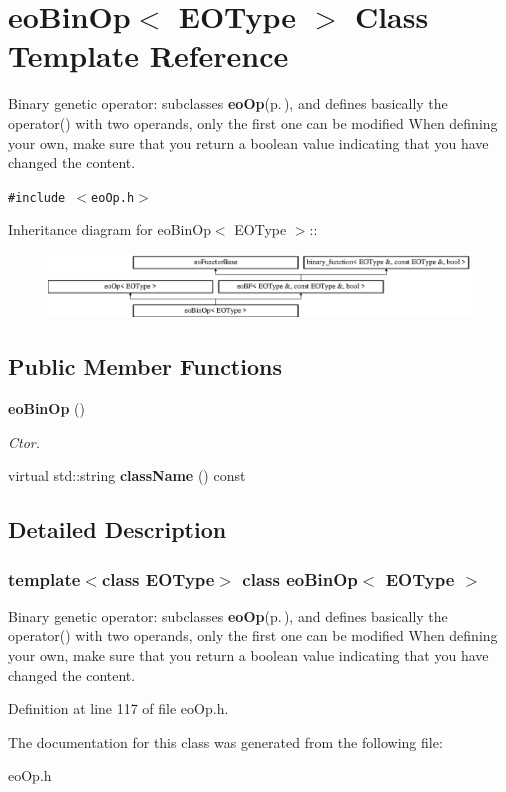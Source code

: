 \section{eo\-Bin\-Op$<$ EOType $>$ Class Template Reference}
\label{classeo_bin_op}
Binary genetic operator: subclasses {\bf eo\-Op}{\rm (p.\,\pageref{classeo_op})}, and defines basically the operator() with two operands, only the first one can be modified When defining your own, make sure that you return a boolean value indicating that you have changed the content.  


{\tt \#include $<$eo\-Op.h$>$}

Inheritance diagram for eo\-Bin\-Op$<$ EOType $>$::\begin{figure}[H]
\begin{center}
\leavevmode
\includegraphics[height=1.70213cm]{classeo_bin_op}
\end{center}
\end{figure}
\subsection*{Public Member Functions}
\begin{CompactItemize}
\item 
{\bf eo\-Bin\-Op} ()\label{classeo_bin_op_a0}

\begin{CompactList}\small\item\em Ctor. \item\end{CompactList}\item 
virtual std::string {\bf class\-Name} () const \label{classeo_bin_op_a1}

\end{CompactItemize}


\subsection{Detailed Description}
\subsubsection*{template$<$class EOType$>$ class eo\-Bin\-Op$<$ EOType $>$}

Binary genetic operator: subclasses {\bf eo\-Op}{\rm (p.\,\pageref{classeo_op})}, and defines basically the operator() with two operands, only the first one can be modified When defining your own, make sure that you return a boolean value indicating that you have changed the content. 



Definition at line 117 of file eo\-Op.h.

The documentation for this class was generated from the following file:\begin{CompactItemize}
\item 
eo\-Op.h\end{CompactItemize}
